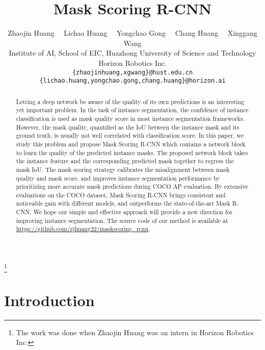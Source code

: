 \documentclass[10pt,twocolumn,letterpaper]{article}
\begin{document}
\title{Mask Scoring R-CNN}

\author{Zhaojin Huang \ \  Lichao Huang \ \  Yongchao Gong \ \   Chang Huang \ \  Xinggang Wang\\
        Institute of AI, School of EIC, Huazhong University of Science and Technology \\
        Horizon Robotics Inc. \\
	{\tt\small \{zhaojinhuang,xgwang\}@hust.edu.cn \{lichao.huang,yongchao.gong,chang.huang\}@horizon.ai}
}

\maketitle


\begin{abstract}



  Letting a deep network be aware of the quality of its own predictions is an interesting yet important problem. In the task of instance segmentation, the confidence of instance classification is used as mask quality score in most instance segmentation frameworks. However, the mask quality, quantified as the IoU between the instance mask and its ground truth, is usually not well correlated with classification score. 
  In this paper, we study this problem and propose Mask Scoring R-CNN which contains a network block to learn the quality of the predicted instance masks.  
  The proposed network block takes the instance feature and the corresponding predicted mask together to regress the mask IoU.
  The mask scoring strategy calibrates the misalignment between mask quality and mask score, and improves instance segmentation performance by prioritizing more accurate mask predictions during COCO AP evaluation.  
  By extensive evaluations on the COCO dataset, Mask Scoring R-CNN brings consistent and noticeable gain with different models, and outperforms the state-of-the-art Mask R-CNN. We hope our simple and effective approach will provide a new direction for improving instance segmentation. The source code of our method is available at \url{https://github.com/zjhuang22/maskscoring_rcnn}.
\end{abstract}

\vspace{-10mm}
\let\thefootnote\relax\footnote{ The work was done when Zhaojin Huang was an intern in Horizon Robotics Inc.}

\section{Introduction}
\end{document}
